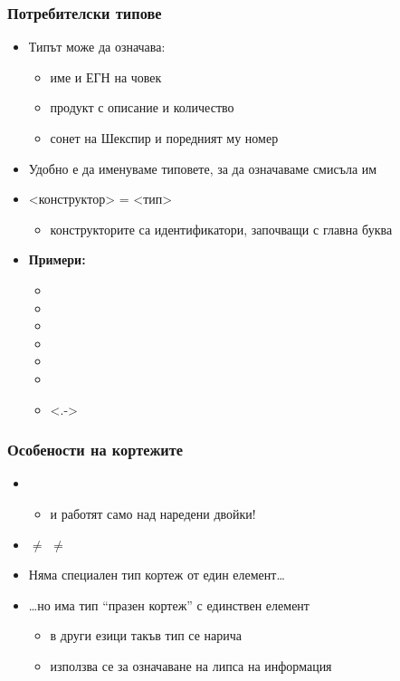 \documentclass{beamer}
\begin{document}
\begin{frame}
  \frametitle{Потребителски типове}

  \begin{itemize}[<+->]
  \item Типът  може да означава:
    \begin{itemize}
    \item име и ЕГН на човек
    \item продукт с описание и количество
    \item сонет на Шекспир и поредният му номер
    \end{itemize}
  \item Удобно е да именуваме типовете, за да означаваме смисъла им
  \item {} <конструктор> \tta= <тип>
    \begin{itemize}
    \item конструкторите са идентификатори, започващи с главна буква
    \end{itemize}
  \item \textbf{Примери:}
    \begin{itemize}
    \item {}
    \item {}
    \item {}
    \item {}
    \item {}
    \item {}
    \item<.-> 
    \end{itemize}
  \end{itemize}
\end{frame}

\begin{frame}
  \frametitle{Особености на кортежите}

  \begin{itemize}[<+->]
  \item {}
    \begin{itemize}
    \item {} и  работят само над наредени двойки!
    \end{itemize}
  \item {} $\neq$  $\neq$ 
  \item Няма специален тип кортеж от един елемент\ldots
  \item \ldots но има тип ``празен кортеж'' \lst{()} с единствен елемент \lst{()}
    \begin{itemize}
    \item в други езици такъв тип се нарича 
    \item използва се за означаване на липса на информация
    \end{itemize}
  \end{itemize}
\end{frame}
\end{document}
